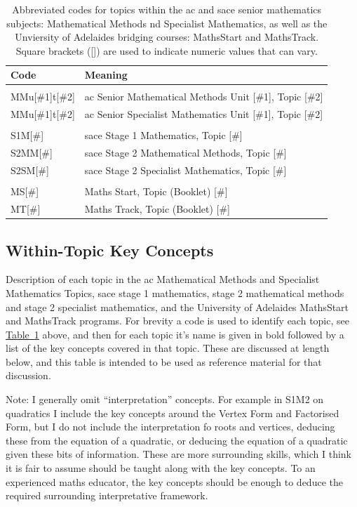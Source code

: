\documentclass[twoside,12pt,a4paper]{report}
\newcommand{\reftab}[1]{\hyperref[tab:#1]{Table~\ref{tab:#1}}}
\begin{document}
\begin{table}[h]
\caption{Abbreviated codes for topics within the \gls{ac} and \gls{sace} senior mathematics subjects: Mathematical Methods nd Specialist Mathematics, as well as the Unviersity of Adelaides bridging courses: MathsStart and MathsTrack. Square brackets ([]) are used to indicate numeric values that can vary. \label{tab:notation}}
\begin{tabular}{ll}
Code & Meaning \\ \hline
 & \\
MMu[\#1]t[\#2] & \gls{ac} Senior Mathematical Methods Unit [\#1], Topic [\#2] \\
MMu[\#1]t[\#2] & \gls{ac} Senior Specialist Mathematics Unit [\#1], Topic [\#2] \\
 & \\
S1M[\#] & \gls{sace} Stage 1 Mathematics, Topic [\#] \\
S2MM[\#] & \gls{sace} Stage 2 Mathematical Methods, Topic [\#] \\
S2SM[\#] & \gls{sace} Stage 2 Specialist Mathematics, Topic [\#] \\
 & \\
MS[\#] & Maths Start, Topic (Booklet) [\#] \\
MT[\#] & Maths Track, Topic (Booklet) [\#]
\end{tabular}
\end{table}

\subsection{Within-Topic Key Concepts}

Description of each topic in the \gls{ac} Mathematical Methods and Specialist Mathematics Topics, \gls{sace} stage 1 mathematics, stage 2 mathematical methods and stage 2 specialist mathematics, and the University of Adelaides MathsStart and MathsTrack programs. For brevity a code is used to identify each topic, see \reftab{notation} above, and then for each topic it's name is given in bold followed by a list of the key concepts covered in that topic. These are discussed at length below, and this table is intended to be used as reference material for that discussion.

Note: I generally omit ``interpretation'' concepts. For example in S1M2 on quadratics I include the key concepts around the Vertex Form and Factorised Form, but I do not include the interpretation fo roots and vertices, deducing these from the equation of a quadratic, or deducing the equation of a quadratic given these bits of information. These are more surrounding skills, which I think it is fair to assume should be taught along with the key concepts. To an experienced maths educator, the key concepts should be enough to deduce the required surrounding interpretative framework. 
\end{document}
